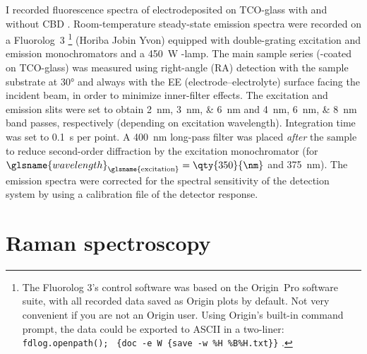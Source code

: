 \documentclass[webedition,openright,titles,swedish,english]{LuaUUThesis}\usepackage[]{graphicx}\usepackage[]{xcolor}
\begin{document}
I recorded fluorescence spectra of electrodeposited   on
\gls{TCO}-glass with and without \gls{CBD} .
Room-temperature steady-state emission spectra were recorded on a Fluorolog~3%
\footnote{%
   The Fluorolog 3's control software was based on the Origin~Pro software suite,
   with all recorded data saved as Origin plots by default. Not very convenient
   if you are not an Origin user.
   Using Origin's built-in command prompt, the data could be exported to ASCII
   in a two-liner: \texttt{fdlog.openpath(); }%
   \verb+{doc -e W {save -w %H %B%H.txt}}+%
   .%
}
(Horiba Jobin Yvon)
equipped with double-grating excitation and emission monochromators and a
\qty{450}{\watt} -lamp.
The main sample series (-coated   on \gls{TCO}-glass)
was measured using right-angle (RA) detection with the sample substrate at \ang{30}
and always with the EE (electrode--electrolyte) surface facing the incident beam,
in order to minimize inner-filter effects.
The excitation and emission slits were set to obtain \qtylist{2;3;6}{\nm} and
\qtylist{4;6;8}{\nm} band passes, respectively (depending on excitation wavelength).
Integration time was set to \qty{0.1}{\second} per point.
A \qty{400}{\nm} long-pass filter was placed \emph{after} the sample to reduce
second-order diffraction by the excitation monochromator
(for $\glsname{wavelength}_\text{\glsname{excitation}}=\qty{350}{\nm}$ and \qty{375}{\nm}).
The emission spectra were corrected for the spectral sensitivity of the
detection system by using a calibration file of the detector response.





\section{Raman spectroscopy}
\label{methods:raman-spectroscopy}
\end{document}

